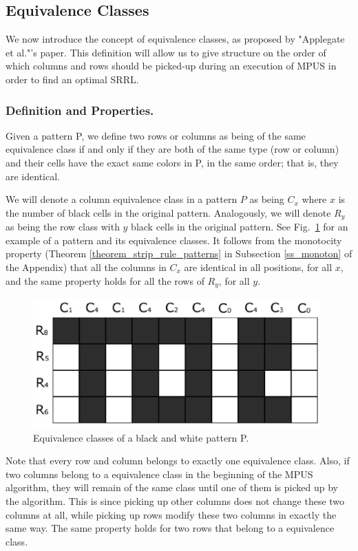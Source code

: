 \subsection{Equivalence Classes}
\label{ss_equiv}

We now introduce the concept of equivalence classes, as proposed by "Applegate et al."'s paper. This definition will allow us to give structure on the order of which columns and rows should be picked-up during an execution of MPUS in order to find an optimal SRRL.

\subsubsection{Definition and Properties.}
Given a pattern P, we define two rows or columns as being of the same equivalence class if and only if they are both of the same type (row or column) and their cells have the exact same colors in P, in the same order; that is, they are identical.

We will denote a column equivalence class in a pattern $P$ as being $C_{x}$ where $x$ is the number of black cells in the original pattern. Analogously, we will denote $R_{y}$ as being the row class with $y$ black cells in the original pattern. See Fig.~\ref{fig:equiv_classes_example} for an example of a pattern and its equivalence classes.
It follows from the monotocity property (Theorem
\ref{theorem_strip_rule_patterns}
in Subsection \ref{ss_monoton} of the Appendix)
 that all the columns in $C_x$ are identical in all
positions, for all $x$, and the same property holds for all the rows of $R_y$,
for all $y$.

\begin{figure}[h]
\centering
\includegraphics[height=5cm]{equiv_classes_example}
\caption{Equivalence classes of a black and white pattern P.}
\label{fig:equiv_classes_example}
\end{figure}

Note that every row and column belongs to exactly one equivalence class. Also, if two columns belong to a equivalence class in the beginning of the MPUS algorithm, they will remain of the same class until one of them is picked up
by the algorithm. This is since picking up other columns does not
change these two columns at all, while picking up rows modify these
two columns in exactly the same way. The same property holds for two
rows that belong to a equivalence class.

